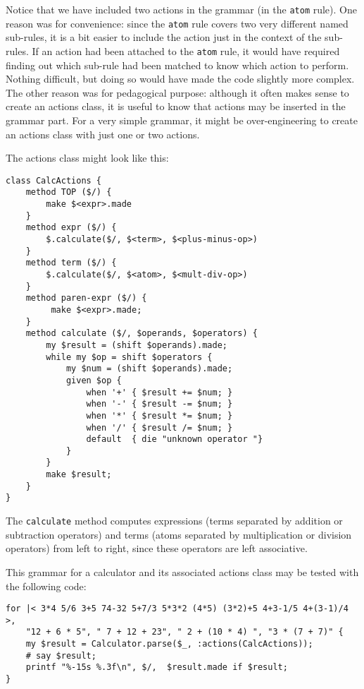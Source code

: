 Notice that we have included two actions in the grammar (in 
the {\tt atom} rule). One reason was for convenience: since 
the {\tt atom} rule covers two very different named 
sub-rules, it is a bit easier to include the action just 
in the context of the sub-rules. If an action had been attached 
to the  {\tt atom} rule, it would have required finding out 
which sub-rule had been matched to know which action to 
perform. Nothing difficult, but doing so would have made the  
code slightly more complex. The other reason was for pedagogical 
purpose: although it often makes sense to create an actions 
class, it is useful to know that actions may be inserted in the 
grammar part. For a very simple grammar, it might be 
over-engineering to create an actions class with just one or 
two actions.

The actions class might look like this:

\begin{verbatim}
class CalcActions {
    method TOP ($/) {
        make $<expr>.made
    }
    method expr ($/) {
        $.calculate($/, $<term>, $<plus-minus-op>)
    }
    method term ($/) {
        $.calculate($/, $<atom>, $<mult-div-op>)
    }
    method paren-expr ($/) {
         make $<expr>.made;
    }
    method calculate ($/, $operands, $operators) {
        my $result = (shift $operands).made;
        while my $op = shift $operators {
            my $num = (shift $operands).made;
            given $op {
                when '+' { $result += $num; }
                when '-' { $result -= $num; }
                when '*' { $result *= $num; }
                when '/' { $result /= $num; }
                default  { die "unknown operator "}
            }
        }
        make $result;
    }
}
\end{verbatim}

The {\tt calculate} method computes expressions (terms 
separated by addition or subtraction operators) and terms 
(atoms separated by multiplication or division operators) 
from left to right, since these operators are left associative.

This grammar for a calculator and its associated actions class 
may be tested with the following code:

\begin{verbatim}
for |< 3*4 5/6 3+5 74-32 5+7/3 5*3*2 (4*5) (3*2)+5 4+3-1/5 4+(3-1)/4 >,
    "12 + 6 * 5", " 7 + 12 + 23", " 2 + (10 * 4) ", "3 * (7 + 7)" { 
    my $result = Calculator.parse($_, :actions(CalcActions));
    # say $result;
    printf "%-15s %.3f\n", $/,  $result.made if $result;
}
\end{verbatim}

